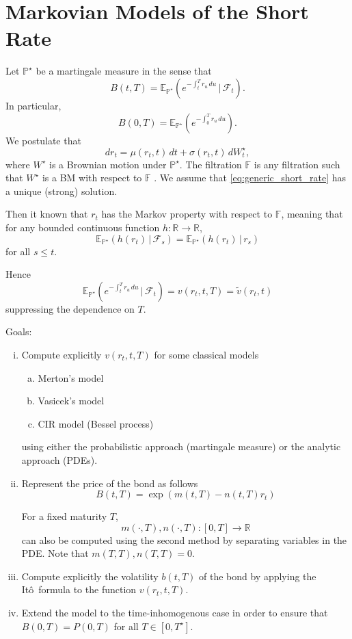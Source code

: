 \documentclass[10pt, oneside, reqno]{amsbook}
\theoremstyle{plain}%
\theoremstyle{definition}
\theoremstyle{remark}
\newcommand{\given}{ \, | \,}
\newcommand{\sigf}{\mathcal{F}}
\newcommand{\R}{\mathbb{R}}
\newcommand{\E}{\mathbb{E}}
\renewcommand{\P}{\mathbb{P}}
\newcommand{\F}{\mathbb{F}}
\newcommand{\ito}{It\^o\ }
\numberwithin{equation}{chapter}
\begin{document}
\chapter{Markovian Models of the Short Rate} %
\label{cha:markovian_models_of_the_short_rate}

	Let $\P^\star$ be a martingale measure in the sense that \[
		B(t, T) = \E_{\P^\star} \left( e^{-\int_t^T r_u \, du} \given \sigf_t \right).
	\]  In particular, \[
		B(0, T) = \E_{\P^\star} \left( e^{-\int_0^T r_u \, du}  \right).  
	\]  We postulate that \begin{equation}
		dr_t = \mu(r_t, t) \, dt + \sigma(r_t, t) \, dW^\star_t,
		\label{eq:generic_short_rate}
	\end{equation} where $W^\star$ is a Brownian motion under $\P^\star$. The filtration $\F$ is any filtration such that $W^\star$ is a BM with respect to $\F$ .  We assume that \eqref{eq:generic_short_rate} has a unique (strong) solution. 
	
	Then it known that $r_t$ has the Markov property with respect to $\F$, meaning that for any bounded continuous function $h : \R \rightarrow \R$, \[
 	\E_{\P^\star} \left(h(r_t) \given \sigf_s \right) = \E_{\P^\star}\left(h(r_t) \given r_s \right)
 \] for all $s \leq t$.   

Hence \[
	\E_{\P^\star} \left(e^{-\int_t^T r_u \, du} \given \sigf_t \right) = v(r_t, t, T) = \tilde v(r_t, t) 
\] suppressing the dependence on $T$.

Goals:
\begin{enumerate}[(i)]
	\item Compute explicitly $v(r_t, t, T)$ for some classical models \begin{enumerate}[(a)]
		\item Merton's model 
		\item Vasicek's model
		\item CIR model (Bessel process)
	\end{enumerate}
	using either the probabilistic approach (martingale measure) or the  analytic approach (PDEs).
	\item Represent the price of the bond as follows \[
		B(t, T) = \exp \left( m(t, T) - n(t, T) r_t \right)
	\]
	
	For a fixed maturity $T$, \[
		m(\cdot, T), n(\cdot, T) : [0, T] \rightarrow \R
	\] can also be computed using the second method by separating variables in the PDE.  Note that $m(T, T), n(T, T) = 0$.
	\item Compute explicitly the volatility $b(t, T)$ of the bond by applying the \ito formula to the function $v(r_t, t, T)$.
	\item Extend the model to the time-inhomogenous case in order to ensure that $B(0, T) = P(0, T)$ for all $T \in [0, T^\star]$.
\end{enumerate}
\end{document}
